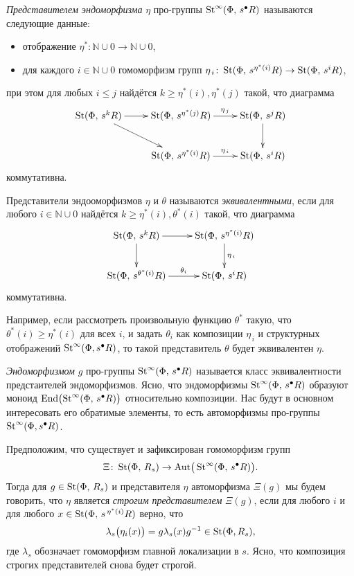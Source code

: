 \documentclass[12pt,a4paper]{article}
\begin{document}
\begin{df}
{\it Представителем эндоморфизма} $\eta$ про-группы $\mathop{\mathrm{St}}\nolimits^\infty(\Phi,\,s^\bullet R)$ называются следующие данные: 
\begin{itemize}
\item
отображение $\eta^*\colon\mathbb N\cup0\rightarrow\mathbb N\cup0$,
\item
для каждого $i\in\mathbb N\cup0$ гомоморфизм групп $\eta_{\,i}\colon\mathop{\mathrm{St}}\nolimits(\Phi,\,s^{\eta^*(i)}R)\rightarrow\mathop{\mathrm{St}}\nolimits(\Phi,\,s^{i}R)$,
\end{itemize}
при этом для любых $i \leq j$ найдётся $k \geq \eta^*(i),\eta^*(j)$ такой, что диаграмма
$$
\xymatrix{
\St(\Phi,\,s^kR)\ar[r]\ar[rd]&\St(\Phi,\,s^{\eta^*(j)}R)\ar[r]^{\ \ \eta_{\,j}}&\St(\Phi,\,s^{j}R)\ar[d]\\
&\St(\Phi,\,s^{\eta^*(i)}R)\ar[r]^{\ \ \eta_{\,i}}&\St(\Phi,\,s^{i}R)
}
$$
коммутативна.

Представители эндооморфизмов $\eta$ и $\theta$ называются {\it эквивалентными}, если для любого $i\in\mathbb N\cup0$ найдётся $k \geq \eta^*(i),\theta^*(i)$ такой, что диаграмма
$$
\xymatrix{
\St(\Phi,\,s^kR)\ar[r]\ar[d]&\St(\Phi,\,s^{\eta^*(i)}R)\ar[d]^{\eta_{\,i}}\\
\St(\Phi,\,s^{\theta^*(i)}R)\ar[r]^{\ \ \theta_{i}}&\St(\Phi,\,s^{i}R)
}
$$
коммутативна.

Например, если рассмотреть произвольную функцию $\theta^*$ такую, что $\theta^*(i)\geq\eta^*(i)$ для всех $i$, и задать $\theta_i$ как композиции $\eta_{\,i}$ и структурных отображений $\mathop{\mathrm{St}}\nolimits^\infty(\Phi,s^\bullet R)$, то такой представитель $\theta$ будет эквивалентен $\eta$.

{\it Эндоморфизмом} $g$ про-группы $\mathop{\mathrm{St}}\nolimits^\infty(\Phi,\,s^\bullet R)$ называется класс эквивалентности предстаителей эндоморфизмов. Ясно, что эндоморфизмы $\mathop{\mathrm{St}}\nolimits^\infty(\Phi,\,s^\bullet R)$ образуют моноид $\mathrm{End}\bigl(\mathop{\mathrm{St}}\nolimits^\infty(\Phi,\,s^\bullet R)\bigr)$ относительно композиции. Нас будут в основном интересовать его обратимые элементы, то есть автоморфизмы про-группы \(\mathop{\mathrm{St}}\nolimits^\infty(\Phi, s^\bullet R)\).

Предположим, что существует и зафиксирован гомоморфизм групп $$\Xi\colon\mathop{\mathrm{St}}\nolimits(\Phi,\,R_s)\rightarrow\mathrm{Aut}\big(\mathop{\mathrm{St}}\nolimits^\infty(\Phi,\,s^\bullet R)\big).$$ Тогда для $g\in\mathop{\mathrm{St}}\nolimits(\Phi,\,R_s)$ и представителя $\eta$ автоморфизма $\Xi(g)$ мы будем говорить, что $\eta$ является {\it строгим представителем} $\Xi(g)$, если для любого $i$ и для любого $x\in\mathop{\mathrm{St}}\nolimits(\Phi,\,s^{\,\eta^*(i)}R)$ верно, что
$$
\lambda_s\big(\eta_i(x)\big) = g \lambda_s(x) g^{-1} \in \mathop{\mathrm{St}}\nolimits(\Phi, R_s),
$$
где $\lambda_s$ обозначает гомоморфизм главной локализации в $s$. Ясно, что композиция строгих представителей снова будет строгой.
\end{df}
\end{document}
